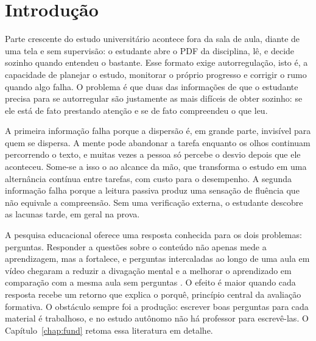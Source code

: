 \chapter{\label{chap:intro}Introdução}


Parte crescente do estudo universitário acontece fora da sala de aula, diante de uma tela e sem supervisão: o estudante abre o PDF da disciplina, lê, e decide sozinho quando entendeu o bastante. Esse formato exige autorregulação, isto é, a capacidade de planejar o estudo, monitorar o próprio progresso e corrigir o rumo quando algo falha. O problema é que duas das informações de que o estudante precisa para se autorregular são justamente as mais difíceis de obter sozinho: se ele está de fato prestando atenção e se de fato compreendeu o que leu.

A primeira informação falha porque a dispersão é, em grande parte, invisível para quem se dispersa. A mente pode abandonar a tarefa enquanto os olhos continuam percorrendo o texto, e muitas vezes a pessoa só percebe o desvio depois que ele aconteceu. Some-se a isso o  ao alcance da mão, que transforma o estudo em uma alternância contínua entre tarefas, com custo para o desempenho. A segunda informação falha porque a leitura passiva produz uma sensação de fluência que não equivale a compreensão. Sem uma verificação externa, o estudante descobre as lacunas tarde, em geral na prova.

A pesquisa educacional oferece uma resposta conhecida para os dois problemas: perguntas. Responder a questões sobre o conteúdo não apenas mede a aprendizagem, mas a fortalece, e perguntas intercaladas ao longo de uma aula em vídeo chegaram a reduzir a divagação mental e a melhorar o aprendizado em comparação com a mesma aula sem perguntas \cite{SKS13}. O efeito é maior quando cada resposta recebe um retorno que explica o porquê, princípio central da avaliação formativa. O obstáculo sempre foi a produção: escrever boas perguntas para cada material é trabalhoso, e no estudo autônomo não há professor para escrevê-las. O Capítulo~\ref{chap:fund} retoma essa literatura em detalhe.

